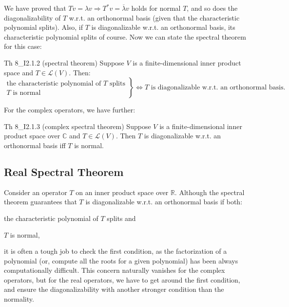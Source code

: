 \documentclass{article}
\begin{document}
We have proved that $Tv = \lambda v \Rightarrow T^*v = \overline{\lambda}v$ holds for normal $T$, and so does the diagonalizability of $T$ w.r.t. an orthonormal basis (given that the characteristic polynomial splits). Also, if $T$ is diagonalizable w.r.t. an orthonormal basis, its characteristic polynomial splits of course. Now we can state the spectral theorem for this case:

\begin{Th}{Th 8\_I2.1.2 (spectral theorem)}
    Suppose $V$ is a finite-dimensional inner product space and $T\in\mathcal{L}(V)$. Then:
    $$ \left. \begin{matrix}
    \text{the characteristic polynomial of } T \text{ splits} \\ 
    T \text{ is normal } \end{matrix} \right\}
    \Leftrightarrow T \text{ is diagonalizable w.r.t. an orthonormal basis}. $$
\end{Th}

For the complex operators, we have further:

\begin{Th}{Th 8\_I2.1.3 (complex spectral theorem)}
    Suppose $V$ is a finite-dimensional inner product space over $\mathbb{C}$ and $T\in\mathcal{L}(V)$. Then $T$ is diagonalizable w.r.t. an orthonormal basis iff $T$ is normal.
\end{Th}

\subsection{Real Spectral Theorem}
Consider an operator $T$ on an inner product space over $\mathbb{R}$. Although the spectral theorem guarantees that $T$ is diagonalizable w.r.t. an orthonormal basis if both:
\begin{compactenum}
    \item the characteristic polynomial of $T$ splits and
    \item $T$ is normal,
\end{compactenum}
it is often a tough job to check the first condition, as the factorization of a polynomial (or, compute all the roots for a given polynomial) has been always computationally difficult. This concern naturally vanishes for the complex operators, but for the real operators, we have to get around the first condition, and ensure the diagonalizability with another stronger condition than the normality.
\end{document}
